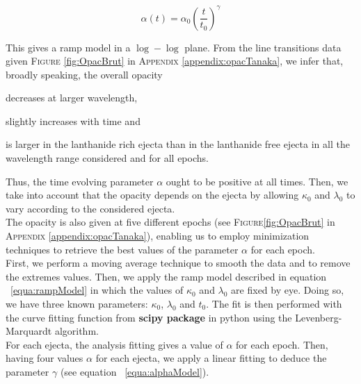 \documentclass[a4paper, twoside, 11pt]{article}
\numberwithin{equation}{section}
\begin{document}
\begin{equation}
\alpha(t) = \alpha_0 \left(\frac{t}{t_0}\right)^{\gamma}
\label{equa:alphaModel}
\end{equation}

This gives a ramp model in a $\log-\log$ plane. 
From  the line transitions data given F\textsc{igure} \ref{fig:OpacBrut} in A\textsc{ppendix} \ref{appendix:opacTanaka},  we infer that, broadly speaking, the overall opacity 
\begin{enumerate*}[label=\roman*)]
\item decreases at larger wavelength, 
\item slightly increases with time and 
\item is larger in the lanthanide rich ejecta than in the lanthanide free ejecta in all the wavelength range considered and for all epochs.
\end{enumerate*}
Thus, the time evolving parameter $\alpha$ ought to be positive at all times. Then, we take into account that the opacity depends on the ejecta by allowing $\kappa_0$ and $\lambda_0$ to vary according to the considered ejecta.   \\


The opacity is also given at five different epochs (see F\textsc{igure}\ref{fig:OpacBrut} in A\textsc{ppendix} \ref{appendix:opacTanaka}), enabling us to employ minimization techniques to retrieve the best values of the parameter $\alpha$ for each epoch. \\

 First, we perform a moving average technique to smooth the data and to remove the extremes values. Then, we apply the ramp model described in equation ~\eqref{equa:rampModel} in which the values of $\kappa_0$ and $\lambda_0$ are fixed by eye. Doing so, we have three known parameters: $\kappa_0$, $\lambda_0$ and $t_0$. The fit is then performed with the curve fitting function from \textbf{scipy package} in python using the Levenberg-Marquardt algorithm. \\
 
For each ejecta, the analysis fitting gives a value of $\alpha$ for each epoch. Then, having four values $\alpha$ for each ejecta, we apply a linear fitting to deduce the parameter $\gamma$ (see equation ~\eqref{equa:alphaModel}). \\
\end{document}
